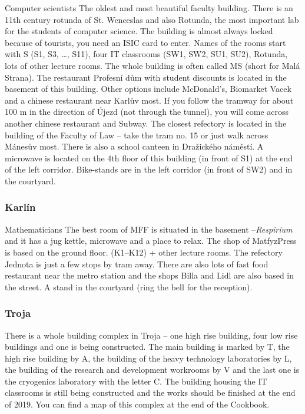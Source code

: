 {Computer scientists}
{The oldest and most beautiful faculty building. There is an 11th century
rotunda of St. Wenceslas and also Rotunda, the most important lab for the
students of computer science. The building is almost always locked because of
tourists, you need an ISIC card to enter.}
{Names of the rooms start with S  (S1, S3, \dots, S11), four IT classrooms
(SW1,
SW2, SU1, SU2), Rotunda, lots of other lecture rooms. The whole building is
often called MS (short for Malá Strana).}
{The restaurant Profesní dům with student discounts is located in the basement
of this building. Other options include McDonald's, Biomarket Vacek and a
chinese restaurant near Karlův most. If you follow the tramway for about 100 m
in the direction of Újezd (not through the tunnel), you will come across another
chinese restaurant and Subway.
The closest refectory is located in the building of the Faculty of Law -- take
the tram no. 15 or just walk across Mánesův most. There is also a school canteen
in Dražického náměstí.
A microwave is located on the 4th floor of this building (in front of S1) at the
end of the left corridor.
}
{Bike-stands are in the left corridor (in front of SW2) and in the courtyard.}


\subsubsection{Karlín}

{Mathematicians}
{The best room of MFF is situated in the basement --\textit{Respirium} and it
has a jug kettle, microwave and a place to relax. The shop of MatfyzPress is
based on the ground floor.}
{ (K1--K12) + other lecture rooms.}
{The refectory Jednota is just a few stops by tram away. There are also lots of
fast food restaurant near the metro station and the shops Billa and Lidl are
also based in the street.}
{A stand in the courtyard (ring the bell for the reception).}

\subsubsection{Troja}
There is a whole building complex in Troja -- one high rise building, four low
rise buildings and one is being constructed. The main building is marked by T,
the high rise building by A, the building of the heavy technology laboratories
by L, the building of the research and development workrooms by V and the last
one is the cryogenics laboratory with the letter C.
The building housing the IT classrooms is still being constructed and the works
should be finished at the end of 2019.
You can find a map of this complex at the end of the Cookbook.

